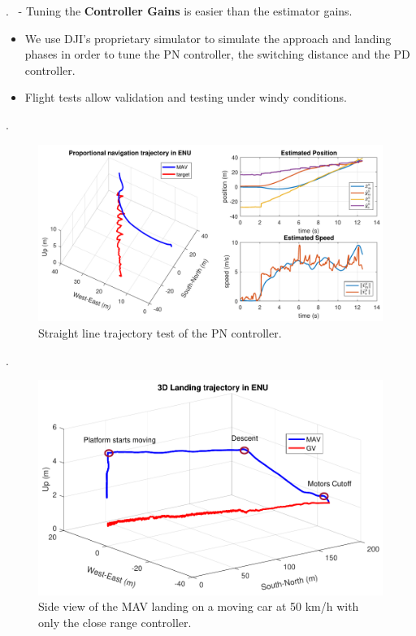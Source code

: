 
\begin{frame}{\thesection. \insertsection \ - \insertsubsection}
	Tuning the \textbf{Controller Gains} is easier than the estimator gains.
	\begin{itemize}
		\item We use DJI's proprietary simulator to simulate the approach and landing phases in order to tune
		the PN controller, the switching distance and the PD controller.
		\item Flight tests allow validation and testing under windy conditions.
	\end{itemize}
\end{frame}



\begin{frame}{\thesection. \insertsection}
	\begin{figure}
		\includegraphics[width=0.8\paperwidth]{figures/pn.pdf}
		\caption{Straight line trajectory test of the PN controller.}
	\end{figure}
\end{frame}


\begin{frame}{\thesection. \insertsection}
	\begin{figure}
		\includegraphics[width=0.8\paperwidth]{figures/landing.pdf}
		\caption{Side view of the MAV landing on a moving car at 50 km/h with only the close range controller.}
	\end{figure}
\end{frame}

